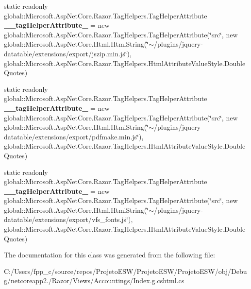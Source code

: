 \begin{DoxyCompactItemize}
\item 
\mbox{\label{class_asp_net_core_1_1_views___accountings___index_aafa8d16230f8e4a4dd6dbd5abc0d14ed}} 
static readonly global\+::\+Microsoft.\+Asp\+Net\+Core.\+Razor.\+Tag\+Helpers.\+Tag\+Helper\+Attribute {\bfseries \+\_\+\+\_\+tag\+Helper\+Attribute\+\_} = new global\+::\+Microsoft.\+Asp\+Net\+Core.\+Razor.\+Tag\+Helpers.\+Tag\+Helper\+Attribute(\char`\"{}src\char`\"{}, new global\+::\+Microsoft.\+Asp\+Net\+Core.\+Html.\+Html\+String(\char`\"{}$\sim$/plugins/jquery-\/datatable/extensions/export/jszip.\+min.\+js\char`\"{}), global\+::\+Microsoft.\+Asp\+Net\+Core.\+Razor.\+Tag\+Helpers.\+Html\+Attribute\+Value\+Style.\+Double\+Quotes)
\item 
\mbox{\label{class_asp_net_core_1_1_views___accountings___index_aaeb8201e367af9de774199df8382afa4}} 
static readonly global\+::\+Microsoft.\+Asp\+Net\+Core.\+Razor.\+Tag\+Helpers.\+Tag\+Helper\+Attribute {\bfseries \+\_\+\+\_\+tag\+Helper\+Attribute\+\_} = new global\+::\+Microsoft.\+Asp\+Net\+Core.\+Razor.\+Tag\+Helpers.\+Tag\+Helper\+Attribute(\char`\"{}src\char`\"{}, new global\+::\+Microsoft.\+Asp\+Net\+Core.\+Html.\+Html\+String(\char`\"{}$\sim$/plugins/jquery-\/datatable/extensions/export/pdfmake.\+min.\+js\char`\"{}), global\+::\+Microsoft.\+Asp\+Net\+Core.\+Razor.\+Tag\+Helpers.\+Html\+Attribute\+Value\+Style.\+Double\+Quotes)
\item 
\mbox{\label{class_asp_net_core_1_1_views___accountings___index_a1d813ded0f1f6847f0c8a362694f1729}} 
static readonly global\+::\+Microsoft.\+Asp\+Net\+Core.\+Razor.\+Tag\+Helpers.\+Tag\+Helper\+Attribute {\bfseries \+\_\+\+\_\+tag\+Helper\+Attribute\+\_} = new global\+::\+Microsoft.\+Asp\+Net\+Core.\+Razor.\+Tag\+Helpers.\+Tag\+Helper\+Attribute(\char`\"{}src\char`\"{}, new global\+::\+Microsoft.\+Asp\+Net\+Core.\+Html.\+Html\+String(\char`\"{}$\sim$/plugins/jquery-\/datatable/extensions/export/vfs\+\_\+fonts.\+js\char`\"{}), global\+::\+Microsoft.\+Asp\+Net\+Core.\+Razor.\+Tag\+Helpers.\+Html\+Attribute\+Value\+Style.\+Double\+Quotes)
\end{DoxyCompactItemize}


The documentation for this class was generated from the following file\+:\begin{DoxyCompactItemize}
\item 
C\+:/\+Users/fpp\+\_\+c/source/repos/\+Projeto\+E\+S\+W/\+Projeto\+E\+S\+W/\+Projeto\+E\+S\+W/obj/\+Debug/netcoreapp2./\+Razor/\+Views/\+Accountings/Index.\+g.\+cshtml.\+cs\end{DoxyCompactItemize}
